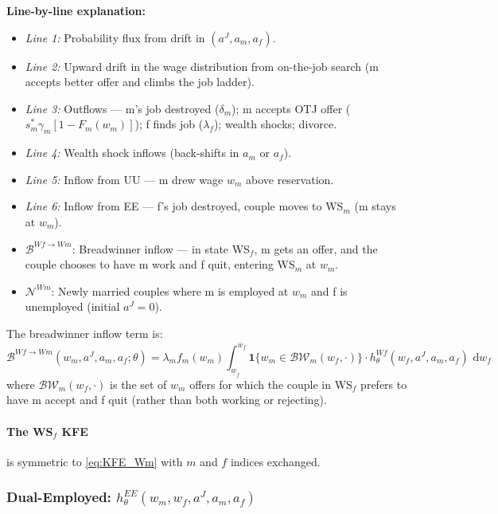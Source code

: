 \documentclass[11pt]{article}
\newcommand{\aJ}{a^{J}}
\newcommand{\bR}{\mathbf{1}}
\newcommand{\dw}{\,\mathrm{d}w}
\begin{document}
\noindent \textbf{Line-by-line explanation:}
\begin{itemize}
    \item \textit{Line 1:} Probability flux from drift in $(\aJ, a_m, a_f)$.
    \item \textit{Line 2:} Upward drift in the wage distribution from on-the-job search (m accepts better offer and climbs the job ladder).
    \item \textit{Line 3:} Outflows --- m's job destroyed ($\delta_m$); m accepts OTJ offer ($s_m^* \gamma_m [1-F_m(w_m)]$); f finds job ($\lambda_f$); wealth shocks; divorce.
    \item \textit{Line 4:} Wealth shock inflows (back-shifts in $a_m$ or $a_f$).
    \item \textit{Line 5:} Inflow from UU --- m drew wage $w_m$ above reservation.
    \item \textit{Line 6:} Inflow from EE --- f's job destroyed, couple moves to WS$_m$ (m stays at $w_m$).
    \item $\mathcal{B}^{Wf \to Wm}$: Breadwinner inflow --- in state WS$_f$, m gets an offer, and the couple chooses to have m work and f quit, entering WS$_m$ at $w_m$.
    \item $\mathcal{N}^{Wm}$: Newly married couples where m is employed at $w_m$ and f is unemployed (initial $\aJ = 0$).
\end{itemize}

The breadwinner inflow term is:
\begin{equation}
    \mathcal{B}^{Wf \to Wm}(w_m, \aJ, a_m, a_f;\theta)
    = \lambda_m f_m(w_m) \int_{\underline{w}_f}^{\overline{w}_f}
        \bR\{w_m \in \mathcal{BW}_m(w_f, \cdot)\} \cdot h_\theta^{Wf}(w_f, \aJ, a_m, a_f)\, \dw_f
    \label{eq:breadwinner_Wm}
\end{equation}
where $\mathcal{BW}_m(w_f, \cdot)$ is the set of $w_m$ offers for which the couple in WS$_f$ prefers to have m accept and f quit (rather than both working or rejecting).

\paragraph{The WS$_f$ KFE} is symmetric to \eqref{eq:KFE_Wm} with $m$ and $f$ indices exchanged.

\subsubsection{Dual-Employed: $h_\theta^{EE}(w_m, w_f, \aJ, a_m, a_f)$}
\end{document}
